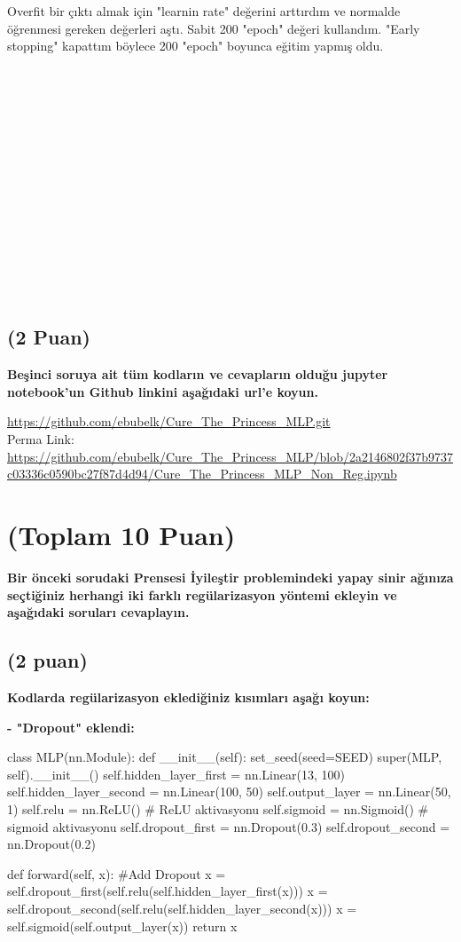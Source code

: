 \documentclass[11pt]{article}
\begin{document}
Overfit bir çıktı almak için "learnin rate" değerini arttırdım ve normalde öğrenmesi gereken değerleri aştı. Sabit 200 "epoch" değeri kullandım. "Early stopping" kapattım böylece 200 "epoch" boyunca eğitim yapmış oldu.
\\
\\
\\
\\
\\
\\
\\
\\
\\
\\
\\
\\
\\
\\
\\
\subsection{(2 Puan)} \textbf{Beşinci soruya ait tüm kodların ve cevapların olduğu jupyter notebook'un Github linkini aşağıdaki url'e koyun.}

\url{https://github.com/ebubelk/Cure_The_Princess_MLP.git}\\
Perma Link:\\
\url{https://github.com/ebubelk/Cure_The_Princess_MLP/blob/2a2146802f37b9737c03336c0590bc27f87d4d94/Cure_The_Princess_MLP_Non_Reg.ipynb}

\section{(Toplam 10 Puan)} \textbf{Bir önceki sorudaki Prensesi İyileştir problemindeki yapay sinir ağınıza seçtiğiniz herhangi iki farklı regülarizasyon yöntemi ekleyin ve aşağıdaki soruları cevaplayın.} 

\subsection{(2 puan)} \textbf{Kodlarda regülarizasyon eklediğiniz kısımları aşağı koyun:} 

\textbf{- "Dropout" eklendi:}
\begin{python}
class MLP(nn.Module):
    def __init__(self):
        set_seed(seed=SEED)
        super(MLP, self).__init__()
        self.hidden_layer_first = nn.Linear(13, 100)
        self.hidden_layer_second = nn.Linear(100, 50)
        self.output_layer = nn.Linear(50, 1)
        self.relu = nn.ReLU() # ReLU aktivasyonu
        self.sigmoid = nn.Sigmoid() # sigmoid aktivasyonu
        self.dropout_first = nn.Dropout(0.3)
        self.dropout_second = nn.Dropout(0.2)
        
    def forward(self, x):
        #Add Dropout
        x = self.dropout_first(self.relu(self.hidden_layer_first(x)))
        x = self.dropout_second(self.relu(self.hidden_layer_second(x)))
        x = self.sigmoid(self.output_layer(x))
        return x
\end{python}
\end{document}
